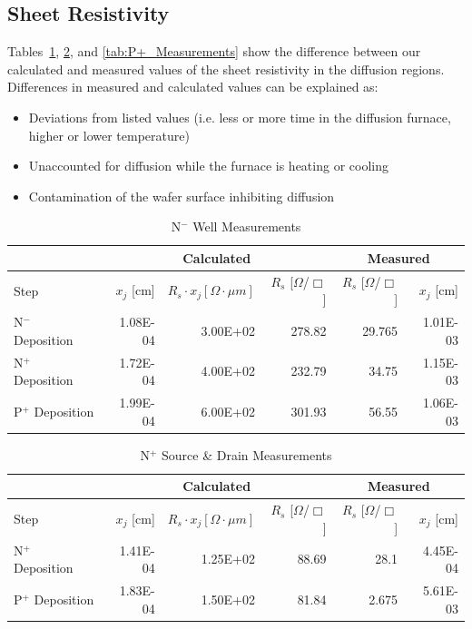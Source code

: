 \documentclass[letter,12pt]{article}
\begin{document}
	\subsection{Sheet Resistivity}
		Tables~\ref{tab:N_Well_Measurements}, \ref{tab:N+_Measurements}, and \ref{tab:P+_Measurements} show the difference between our calculated and measured values of the sheet resistivity in the diffusion regions. Differences in measured and calculated values can be explained as:
		\begin{itemize}
			\item Deviations from listed values (i.e. less or more time in the diffusion furnace, higher or lower temperature)
			\item Unaccounted for diffusion while the furnace is heating or cooling
			\item Contamination of the wafer surface inhibiting diffusion
		\end{itemize}
		
		\begin{table}[h!]
			\centering
			\begin{tabular}{l || r | r | r || r | r}
				~ & \multicolumn{3}{c}{Calculated} & \multicolumn{2}{c}{Measured} \\
				\hline
				Step & $x_j$ [cm] & $R_s \cdot x_j [\Omega\cdot\mu m]$ & $R_s$ [$\Omega$/$\Box$] &  $R_s$ [$\Omega$/$\Box$] & $x_j$ [cm] \\
				\hline
				N$^-$ Deposition & 1.08E-04 & 3.00E+02 & 278.82 & 29.765 & 1.01E-03 \\
				N$^+$ Deposition & 1.72E-04 & 4.00E+02 & 232.79 & 34.75 & 1.15E-03 \\
				P$^+$ Deposition & 1.99E-04 & 6.00E+02 & 301.93 & 56.55 & 1.06E-03 \\
			\end{tabular}
			\caption{N$^-$ Well Measurements}
			\label{tab:N_Well_Measurements}
		\end{table}
	
		\begin{table}[h!]
			\centering
			\begin{tabular}{l || r | r | r || r | r}
				~ & \multicolumn{3}{c}{Calculated} & \multicolumn{2}{c}{Measured} \\
				\hline
				Step & $x_j$ [cm] & $R_s \cdot x_j [\Omega\cdot\mu m]$ & $R_s$ [$\Omega$/$\Box$] &  $R_s$ [$\Omega$/$\Box$] & $x_j$ [cm] \\
				\hline
				N$^+$ Deposition & 1.41E-04 & 1.25E+02 & 88.69 & 28.1 & 4.45E-04 \\
				P$^+$ Deposition & 1.83E-04 & 1.50E+02 & 81.84 & 2.675 & 5.61E-03 \\
			\end{tabular}
			\caption{N$^+$ Source \& Drain Measurements}
			\label{tab:N+_Measurements}
		\end{table}
\end{document}
